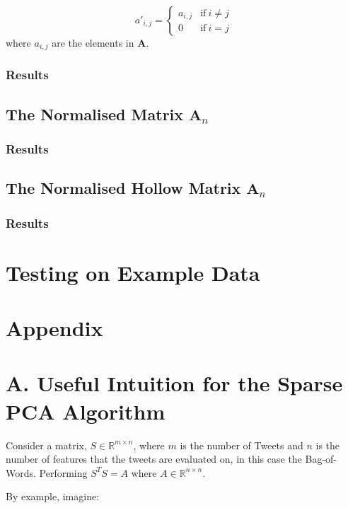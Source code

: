 \documentclass[11pt,a4paper]{article}
\begin{document}
\begin{equation}
a'_{i, j} = 
\begin{cases}
a_{i, j} & \text{if}\ i \neq j\\
0 & \text{if}\ i = j
\end{cases}
\end{equation}
where $a_{i, j}$ are the elements in $\mathbf{A}$.

\subsubsection{Results}

\subsection{The Normalised Matrix $\mathbf{A}_{n}$}
\subsubsection{Results}


\subsection{The Normalised Hollow Matrix $\mathbf{A}_{n}$}
\subsubsection{Results}
\section{Testing on Example Data}

\clearpage


\clearpage

\section*{Appendix}

\section*{A. Useful Intuition for the Sparse PCA Algorithm}
Consider a matrix, $S\in \mathbb{R}^{m\times n}$, where $m$ is the number of Tweets and $n$ is the number of features that the tweets are evaluated on, in this case the Bag-of-Words. Performing $S^TS = A$ where $A \in \mathbb{R}^{n\times n}$. 

By example, imagine:
\end{document}
